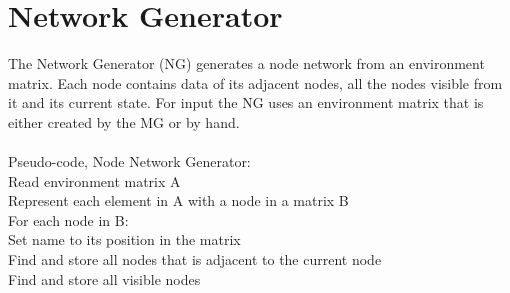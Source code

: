 \section{Network Generator}
The Network Generator (NG) generates a node network from an environment matrix. Each node contains data of its adjacent nodes, all the nodes visible from it and its current state. For input the NG uses an environment matrix that is either created by the MG or by hand.\\
\\
\noindent Pseudo-code, Node Network Generator:\\
\indent Read environment matrix A\\
\indent Represent each element in A with a node in a matrix B\\
\indent For each node in B:\\
\indent \indent Set name to its position in the matrix\\
\indent \indent Find and store all nodes that is adjacent to the current node\\
\indent \indent Find and store all visible nodes

